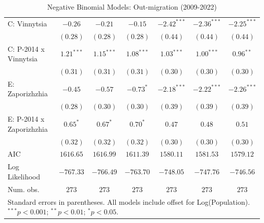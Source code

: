 \begin{table}
\begin{center}
\begin{small}
\begin{tabular}{l c c c c c c}
C: Vinnytsia                & $-0.26$       & $-0.21$      & $-0.15$        & $-2.42^{***}$ & $-2.36^{***}$ & $-2.25^{***}$ \\
                            & $(0.28)$      & $(0.28)$     & $(0.28)$       & $(0.44)$      & $(0.44)$      & $(0.44)$      \\
C: P-2014 x Vinnytsia       & $1.21^{***}$  & $1.15^{***}$ & $1.08^{***}$   & $1.03^{***}$  & $1.00^{***}$  & $0.96^{**}$   \\
                            & $(0.31)$      & $(0.31)$     & $(0.31)$       & $(0.30)$      & $(0.30)$      & $(0.30)$      \\
E: Zaporizhzhia             & $-0.45$       & $-0.57$      & $-0.73^{*}$    & $-2.18^{***}$ & $-2.22^{***}$ & $-2.26^{***}$ \\
                            & $(0.28)$      & $(0.30)$     & $(0.30)$       & $(0.39)$      & $(0.39)$      & $(0.39)$      \\
E: P-2014 x Zaporizhzhia    & $0.65^{*}$    & $0.67^{*}$   & $0.70^{*}$     & $0.47$        & $0.48$        & $0.51$        \\
                            & $(0.32)$      & $(0.32)$     & $(0.32)$       & $(0.30)$      & $(0.30)$      & $(0.30)$      \\
\hline
AIC                         & $1616.65$     & $1616.99$    & $1611.39$      & $1580.11$     & $1581.53$     & $1579.12$     \\
Log Likelihood              & $-767.33$     & $-766.49$    & $-763.70$      & $-748.05$     & $-747.76$     & $-746.56$     \\
Num. obs.                   & $273$         & $273$        & $273$          & $273$         & $273$         & $273$         \\
\hline
\multicolumn{7}{l}{\tiny{Standard errors in parentheses. All models include offset for Log(Population). $^{***}p<0.001$; $^{**}p<0.01$; $^{*}p<0.05$.}}
\end{tabular}
\end{small}
\caption{Negative Binomial Models: Out-migration (2009-2022)}
\label{tab:out_migration}
\end{center}
\end{table}
